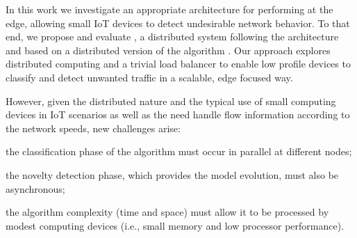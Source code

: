 % 
% 

In this work we investigate an appropriate architecture for performing \nd at
the edge, allowing small IoT devices to detect undesirable network behavior.
To that end, we propose and evaluate \mfog, a distributed \nd system following
the \arch architecture \cite{Cassales2019a} and based on a distributed version
of the algorithm \minas \cite{Faria2016minas}.
Our approach explores distributed computing and a trivial load balancer to
enable low profile devices to classify and detect unwanted traffic in a
scalable, edge focused way.


However, given the distributed nature and the typical use of small computing
devices in IoT scenarios as well as the need handle flow information according to the network speeds, new challenges arise:
\begin{enumerate*}[label=(\emph{\roman*})]
  \item the classification phase of the algorithm must occur in parallel at
  different nodes;
  \item the novelty detection phase, which provides the model evolution, must
  also be asynchronous;
  \item the algorithm complexity (time and space) must allow it to be processed
  by modest computing devices (i.e., small memory and low processor performance).
\end{enumerate*}

